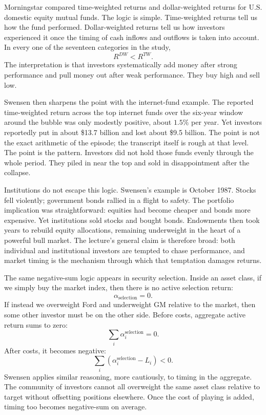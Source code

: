Morningstar compared time-weighted returns and dollar-weighted returns for U.S. domestic equity mutual funds. The logic is simple. Time-weighted returns tell us how the fund performed. Dollar-weighted returns tell us how investors experienced it once the timing of cash inflows and outflows is taken into account. In every one of the seventeen categories in the study,
\begin{equation}
R^{DW}<R^{TW}.
\end{equation}
The interpretation is that investors systematically add money after strong performance and pull money out after weak performance. They buy high and sell low.

Swensen then sharpens the point with the internet-fund example. The reported time-weighted return across the top internet funds over the six-year window around the bubble was only modestly positive, about \(1.5\%\) per year. Yet investors reportedly put in about \$13.7 billion and lost about \$9.5 billion. The point is not the exact arithmetic of the episode; the transcript itself is rough at that level. The point is the pattern. Investors did not hold those funds evenly through the whole period. They piled in near the top and sold in disappointment after the collapse.

Institutions do not escape this logic. Swensen's example is October 1987. Stocks fell violently; government bonds rallied in a flight to safety. The portfolio implication was straightforward: equities had become cheaper and bonds more expensive. Yet institutions sold stocks and bought bonds. Endowments then took years to rebuild equity allocations, remaining underweight in the heart of a powerful bull market. The lecture's general claim is therefore broad: both individual and institutional investors are tempted to chase performance, and market timing is the mechanism through which that temptation damages returns.

The same negative-sum logic appears in security selection. Inside an asset class, if we simply buy the market index, then there is no active selection return:
\begin{equation}
\alpha_{\text{selection}}=0.
\end{equation}
If instead we overweight Ford and underweight GM relative to the market, then some other investor must be on the other side. Before costs, aggregate active return sums to zero:
\begin{equation}
\sum_i \alpha^{\text{selection}}_i = 0.
\end{equation}
After costs, it becomes negative:
\begin{equation}
\sum_i \left(\alpha^{\text{selection}}_i-L_i\right) < 0.
\end{equation}
Swensen applies similar reasoning, more cautiously, to timing in the aggregate. The community of investors cannot all overweight the same asset class relative to target without offsetting positions elsewhere. Once the cost of playing is added, timing too becomes negative-sum on average.

